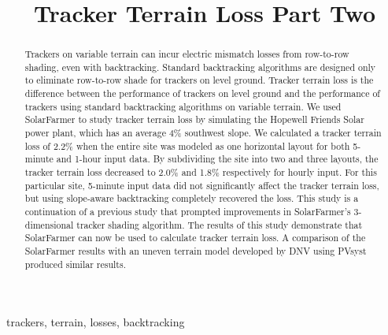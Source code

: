 \documentclass[conference]{IEEEtran}
\begin{document}
\title{Tracker Terrain Loss Part Two}

\author{
	}

\maketitle

\begin{abstract}
Trackers on variable terrain can incur electric mismatch losses from row-to-row shading, even with backtracking. Standard backtracking algorithms are designed only to eliminate row-to-row shade for trackers on level ground. Tracker terrain loss is the difference between the performance of trackers on level ground and the performance of trackers using standard backtracking algorithms on variable terrain. We used SolarFarmer to study tracker terrain loss by simulating the Hopewell Friends Solar power plant, which has an average 4\% southwest slope. We calculated a tracker terrain loss of 2.2\% when the entire site was modeled as one horizontal layout for both 5-minute and 1-hour input data. By subdividing the site into two and three layouts, the tracker terrain loss decreased to 2.0\% and 1.8\% respectively for hourly input. For this particular site, 5-minute input data did not significantly affect the tracker terrain loss, but using slope-aware backtracking completely recovered the loss. This study is a continuation of a previous study that prompted improvements in SolarFarmer's 3-dimensional tracker shading algorithm. The results of this study demonstrate that SolarFarmer can now be used to calculate tracker terrain loss. A comparison of the SolarFarmer results with an uneven terrain model developed by DNV using PVsyst produced similar results.
\end{abstract}

\begin{IEEEkeywords}
trackers, terrain, losses, backtracking
\end{IEEEkeywords}
\end{document}
